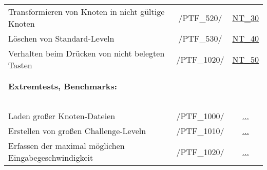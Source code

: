 \begin{longtable}{p{0.5\hsize}p{0.275\hsize}p{0.275\hsize}}
	  \multicolumn{1}{L{6.5cm}}{Transformieren von Knoten in nicht gültige Knoten}
	& \multicolumn{1}{c}{/PTF\_520/}
	& \multicolumn{1}{c}{\hyperref[NT:30]{NT\_30}}
	
	\\
	
	  \multicolumn{1}{L{6.5cm}}{Löschen von Standard-Leveln}
	& \multicolumn{1}{c}{/PTF\_530/}
	& \multicolumn{1}{c}{\hyperref[NT:40]{NT\_40}}
	
	\\
	
	  \multicolumn{1}{L{6.5cm}}{Verhalten beim Drücken von nicht belegten Tasten}
	& \multicolumn{1}{c}{/PTF\_1020/}
	& \multicolumn{1}{c}{\hyperref[NT:50]{NT\_50}}
	
	\\
	\\
	\\
	
	
	

	  \multicolumn{3}{l}{\textbf{Extremtests, Benchmarks:}}
	  
	\\
	
	  \multicolumn{3}{l}{~}
	  
	\\
	
	  \multicolumn{1}{L{6.5cm}}{Laden großer Knoten-Dateien}
	& \multicolumn{1}{c}{/PTF\_1000/}
	& \multicolumn{1}{c}{\hyperref[]{...}}
	
	\\
	
	  \multicolumn{1}{L{6.5cm}}{Erstellen von großen Challenge-Leveln}
	& \multicolumn{1}{c}{/PTF\_1010/}
	& \multicolumn{1}{c}{\hyperref[]{...}}
	
	\\
	
	  \multicolumn{1}{L{6.5cm}}{Erfassen der maximal möglichen Eingabegeschwindigkeit}
	& \multicolumn{1}{c}{/PTF\_1020/}
	& \multicolumn{1}{c}{\hyperref[]{...}}
	
	\\
	
\end{longtable}


